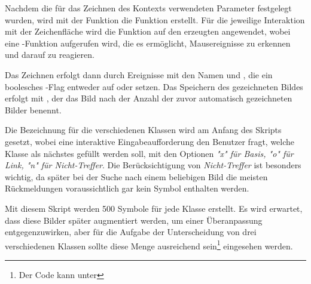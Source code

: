 Nachdem die für das Zeichnen des Kontexts verwendeten Parameter festgelegt wurden, wird mit der Funktion   die Funktion  erstellt.
Für die jeweilige Interaktion mit der Zeichenfläche wird die Funktion  auf den erzeugten  angewendet, wobei eine -Funktion aufgerufen wird, die es ermöglicht, Mausereignisse zu erkennen und darauf zu reagieren.

Das Zeichnen erfolgt dann durch Ereignisse mit den Namen  und , die ein boolesches -Flag entweder auf  oder  setzen.
Das Speichern des gezeichneten Bildes erfolgt mit , der das Bild nach der Anzahl der zuvor automatisch gezeichneten Bilder benennt.

Die Bezeichnung für die verschiedenen Klassen wird am Anfang des Skripts gesetzt, wobei eine interaktive Eingabeaufforderung den Benutzer fragt, welche Klasse als nächstes gefüllt werden soll, mit den Optionen \textit{"x" für Basis, "o" für Link, "n" für Nicht-Treffer}.
Die Berücksichtigung von \textit{Nicht-Treffer} ist besonders wichtig, da später bei der Suche nach einem beliebigen Bild die meisten Rückmeldungen voraussichtlich gar kein Symbol enthalten werden.

Mit diesem Skript werden 500 Symbole für jede Klasse erstellt.
Es wird erwartet, dass diese Bilder später augmentiert werden, um einer Überanpassung entgegenzuwirken, aber für die Aufgabe der Unterscheidung von drei verschiedenen Klassen sollte diese Menge ausreichend sein\footnote{Der Code kann unter  } eingesehen werden.

